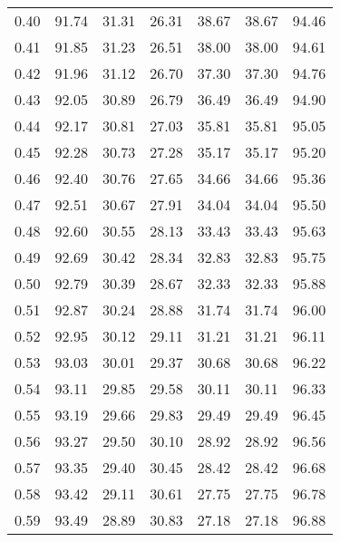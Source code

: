 \begin{tabular}{|c|c|c|c|c|c|c|}
      0.40 &     91.74 &     31.31 &      26.31 &   38.67 &      38.67 &         94.46 \\
      0.41 &     91.85 &     31.23 &      26.51 &   38.00 &      38.00 &         94.61 \\
      0.42 &     91.96 &     31.12 &      26.70 &   37.30 &      37.30 &         94.76 \\
      0.43 &     92.05 &     30.89 &      26.79 &   36.49 &      36.49 &         94.90 \\
      0.44 &     92.17 &     30.81 &      27.03 &   35.81 &      35.81 &         95.05 \\
      0.45 &     92.28 &     30.73 &      27.28 &   35.17 &      35.17 &         95.20 \\
      0.46 &     92.40 &     30.76 &      27.65 &   34.66 &      34.66 &         95.36 \\
      0.47 &     92.51 &     30.67 &      27.91 &   34.04 &      34.04 &         95.50 \\
      0.48 &     92.60 &     30.55 &      28.13 &   33.43 &      33.43 &         95.63 \\
      0.49 &     92.69 &     30.42 &      28.34 &   32.83 &      32.83 &         95.75 \\
      0.50 &     92.79 &     30.39 &      28.67 &   32.33 &      32.33 &         95.88 \\
      0.51 &     92.87 &     30.24 &      28.88 &   31.74 &      31.74 &         96.00 \\
      0.52 &     92.95 &     30.12 &      29.11 &   31.21 &      31.21 &         96.11 \\
      0.53 &     93.03 &     30.01 &      29.37 &   30.68 &      30.68 &         96.22 \\
      0.54 &     93.11 &     29.85 &      29.58 &   30.11 &      30.11 &         96.33 \\
      0.55 &     93.19 &     29.66 &      29.83 &   29.49 &      29.49 &         96.45 \\
      0.56 &     93.27 &     29.50 &      30.10 &   28.92 &      28.92 &         96.56 \\
      0.57 &     93.35 &     29.40 &      30.45 &   28.42 &      28.42 &         96.68 \\
      0.58 &     93.42 &     29.11 &      30.61 &   27.75 &      27.75 &         96.78 \\
      0.59 &     93.49 &     28.89 &      30.83 &   27.18 &      27.18 &         96.88 \\

\end{tabular}
